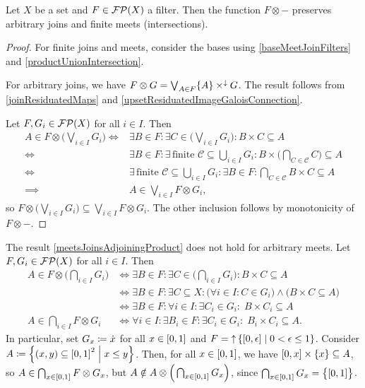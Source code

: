 \begin{proposition} \label{meetsJoinsAdjoiningProduct}
Let $X$ be a set and $F\in\operatorname{\mathcal{FP}}(X)$ a filter. Then the function $F\otimes -$ preserves arbitrary joins and finite meets (intersections).
\end{proposition}
\begin{proof}
For finite joins and meets, consider the bases using \ref{baseMeetJoinFilters} and \ref{productUnionIntersection}.

For arbitrary joins, we have $F\otimes G = \bigvee_{A\in F}\{A\}\times^{\downarrow}G$. The result follows from \ref{joinResiduatedMaps} and \ref{upsetResiduatedImageGaloisConnection}. 


Let $F,G_i \in \operatorname{\mathcal{FP}}(X)$ for all $i\in I$. Then
\begin{align*}
A\in F\otimes \Big(\bigvee_{i\in I}G_i\Big) \iff& \exists B\in F: \exists C\in \Big(\bigvee_{i\in I}G_i\Big): B\times C \subseteq A \\
\iff& \exists B\in F: \exists \,\text{finite $\mathcal{C}\subseteq \bigcup_{i\in I}G_i$}: B\times \Big(\bigcap_{C\in\mathcal{C}} C\Big) \subseteq A \\
\iff& \exists \,\text{finite $\mathcal{C}\subseteq \bigcup_{i\in I}G_i$}: \exists B\in F:  \bigcap_{C\in\mathcal{C}} B\times C \subseteq A \\
\implies& A\in \bigvee_{i\in I}F\otimes G_i,
\end{align*}
so $F\otimes \Big(\bigvee_{i\in I}G_i\Big) \subseteq \bigvee_{i\in I}F\otimes G_i$. The other inclusion follows by monotonicity of $F\otimes -$.
\end{proof}

\begin{example}
The result \ref{meetsJoinsAdjoiningProduct} does not hold for arbitrary meets. Let $F,G_i \in \operatorname{\mathcal{FP}}(X)$ for all $i\in I$. Then
\begin{align*}
A\in F\otimes \Big(\bigcap_{i\in I}G_i\Big) &\iff \exists B\in F: \exists C\in \Big(\bigcap_{i\in I}G_i\Big): B\times C \subseteq A \\
&\iff \exists B\in F: \exists C\subseteq X: \big(\forall i\in I: C\in G_i\big) \land \big(B\times C \subseteq A\big) \\
&\iff \exists B\in F: \forall i\in I: \exists C_i\in G_i: \; B\times C_i \subseteq A \\
A\in \bigcap_{i\in I}F\otimes G_i &\iff \forall i\in I: \exists B_i\in F: \exists C_i\in G_i: \; B_i\times C_i \subseteq A.
\end{align*}
In particular, set $G_x \coloneqq \dot{x}$ for all $x\in \interval{0,1}$ and $F = \upset \setbuilder{\interval{0,\epsilon}}{0 < \epsilon \leq 1}$. Consider $A\defeq \setbuilder{(x,y)\subseteq \interval{0,1}^2}{x\leq y}$. Then, for all $x\in \interval{0,1}$, we have $\interval{0,x}\times \{x\}\subseteq A$, so $A\in \bigcap_{x\in \interval{0,1}}F\otimes G_x$, but $A\notin A\otimes \Big(\bigcap_{x\in\interval{0,1}}G_x\Big)$, since $\bigcap_{x\in\interval{0,1}}G_x = \big\{\interval{0,1}\big\}$.
\end{example}

